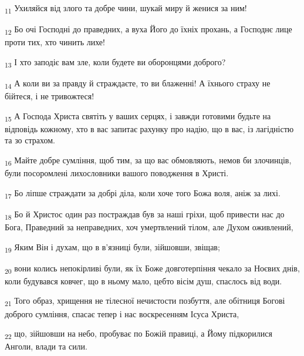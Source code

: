 \begin{tcolorbox}
\textsubscript{11} Ухиляйся від злого та добре чини, шукай миру й женися за ним!
\end{tcolorbox}
\begin{tcolorbox}
\textsubscript{12} Бо очі Господні до праведних, а вуха Його до їхніх прохань, а Господнє лице проти тих, хто чинить лихе!
\end{tcolorbox}
\begin{tcolorbox}
\textsubscript{13} І хто заподіє вам зле, коли будете ви оборонцями доброго?
\end{tcolorbox}
\begin{tcolorbox}
\textsubscript{14} А коли ви за правду й страждаєте, то ви блаженні! А їхнього страху не бійтеся, і не тривожтеся!
\end{tcolorbox}
\begin{tcolorbox}
\textsubscript{15} А Господа Христа святіть у ваших серцях, і завжди готовими будьте на відповідь кожному, хто в вас запитає рахунку про надію, що в вас, із лагідністю та зо страхом.
\end{tcolorbox}
\begin{tcolorbox}
\textsubscript{16} Майте добре сумління, щоб тим, за що вас обмовляють, немов би злочинців, були посоромлені лихословники вашого поводження в Христі.
\end{tcolorbox}
\begin{tcolorbox}
\textsubscript{17} Бо ліпше страждати за добрі діла, коли хоче того Божа воля, аніж за лихі.
\end{tcolorbox}
\begin{tcolorbox}
\textsubscript{18} Бо й Христос один раз постраждав був за наші гріхи, щоб привести нас до Бога, Праведний за неправедних, хоч умертвлений тілом, але Духом оживлений,
\end{tcolorbox}
\begin{tcolorbox}
\textsubscript{19} Яким Він і духам, що в в'язниці були, зійшовши, звіщав;
\end{tcolorbox}
\begin{tcolorbox}
\textsubscript{20} вони колись непокірливі були, як їх Боже довготерпіння чекало за Ноєвих днів, коли будувався ковчег, що в ньому мало, цебто вісім душ, спаслось від води.
\end{tcolorbox}
\begin{tcolorbox}
\textsubscript{21} Того образ, хрищення не тілесної нечистости позбуття, але обітниця Богові доброго сумління, спасає тепер і нас воскресенням Ісуса Христа,
\end{tcolorbox}
\begin{tcolorbox}
\textsubscript{22} що, зійшовши на небо, пробуває по Божій правиці, а Йому підкорилися Анголи, влади та сили.
\end{tcolorbox}
